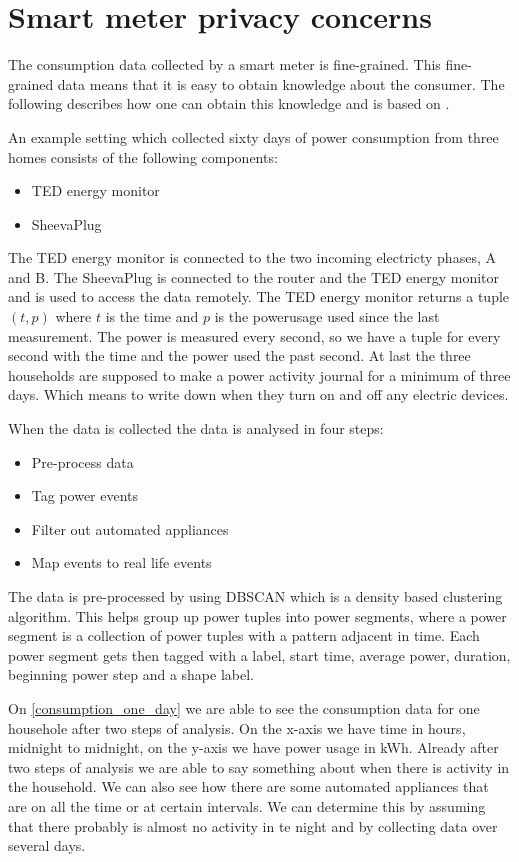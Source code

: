 \section{Smart meter privacy concerns}
The consumption data collected by a smart meter is fine-grained.
This fine-grained data means that it is easy to obtain knowledge about the consumer.
The following describes how one can obtain this knowledge and is based on \citet{privacy_memoir}.


An example setting which collected sixty days of power consumption from three homes consists of the following components:
\begin{itemize}
\item TED energy monitor
\item SheevaPlug
\end{itemize}
The TED energy monitor is connected to the two incoming electricty phases, A and B.\cite{TED_installation_guide}
The SheevaPlug is connected to the router and the TED energy monitor and is used to access the data remotely.
The TED energy monitor returns a tuple $(t,p)$ where $t$ is the time and $p$ is the powerusage used since the last measurement.
The power is measured every second, so we have a tuple for every second with the time and the power used the past second.
At last the three households are supposed to make a power activity journal for a minimum of three days.
Which means to write down when they turn on and off any electric devices.

When the data is collected the data is analysed in four steps:
\begin{itemize}
\item Pre-process data
\item Tag power events
\item Filter out automated appliances
\item Map events to real life events
\end{itemize}

The data is pre-processed by using DBSCAN which is a density based clustering algorithm.
This helps group up power tuples into power segments, where a power segment is a collection of power tuples with a pattern adjacent in time.
Each power segment gets then tagged with a label, start time, average power, duration, beginning power step and a shape label.


On \cref{consumption_one_day} we are able to see the consumption data for one househole after two steps of analysis.
On the x-axis we have time in hours, midnight to midnight, on the y-axis we have power usage in kWh.
Already after two steps of analysis we are able to say something about when there is activity in the household.
We can also see how there are some automated appliances that are on all the time or at certain intervals.
We can determine this by assuming that there probably is almost no activity in te night and by collecting data over several days.


